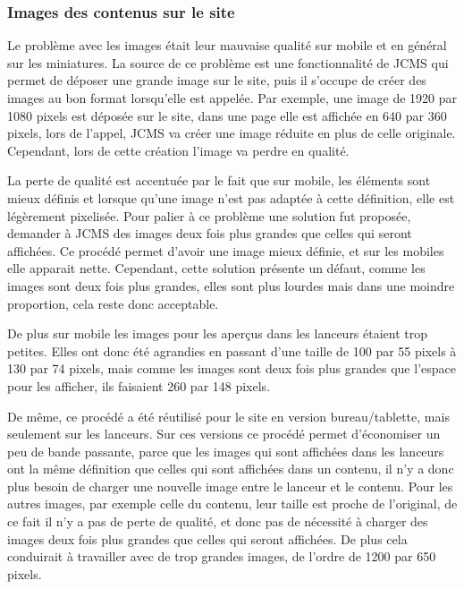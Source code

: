 \documentclass[12pt,a4paper]{article}
\begin{document}
\subsubsection{Images des contenus sur le site}
Le problème avec les images était leur mauvaise qualité sur mobile et en général sur les miniatures. La source de ce problème est une fonctionnalité de \gls{JCMS} qui permet de déposer une grande image sur le site, puis il s'occupe de créer des images au bon format lorsqu'elle est appelée. Par exemple, une image de 1920 par 1080 pixels est déposée sur le site, dans une page elle est affichée en 640 par 360 pixels, lors de l'appel, \gls{JCMS} va créer une image réduite en plus de celle originale. Cependant, lors de cette création l'image va perdre en qualité.\par
\medskip
La perte de qualité est accentuée par le fait que sur mobile, les éléments sont mieux définis et lorsque qu'une image n'est pas adaptée à cette définition, elle est légèrement pixelisée. Pour palier à ce problème une solution fut proposée, demander à \gls{JCMS} des images deux fois plus grandes que celles qui seront affichées. Ce procédé permet d'avoir une image mieux définie, et sur les mobiles elle apparait nette. Cependant, cette solution présente un défaut, comme les images sont deux fois plus grandes, elles sont plus lourdes mais dans une moindre proportion, cela reste donc acceptable.\par
De plus sur mobile les images pour les aperçus dans les lanceurs étaient trop petites. Elles ont donc été agrandies en passant d'une taille de 100 par 55 pixels à 130 par 74 pixels, mais comme les images sont deux fois plus grandes que l'espace pour les afficher, ils faisaient 260 par 148 pixels.\par 
De même, ce procédé a été réutilisé pour le site en version bureau/tablette, mais seulement sur les lanceurs. Sur ces versions ce procédé permet d'économiser un peu de bande passante, parce que les images qui sont affichées dans les lanceurs ont la même définition que celles qui sont affichées dans un contenu, il n'y a donc plus besoin de charger une nouvelle image entre le lanceur et le contenu. Pour les autres images, par exemple celle du contenu, leur taille est proche de l'original, de ce fait il n'y a pas de perte de qualité, et donc pas de nécessité à charger des images deux fois plus grandes que celles qui seront affichées. De plus cela conduirait à travailler avec de trop grandes images, de l'ordre de 1200 par 650 pixels.\par
\end{document}
